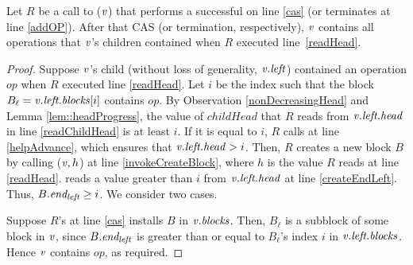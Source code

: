 \begin{lemma}\label{successfulRefresh}
Let $R$ be a call to ($\mbox{\textnormal{\textit{v}}}$) that performs a successful  on line \ref{cas} (or terminates at line \ref{addOP}).
After that CAS (or termination, respectively), $\mbox{\textnormal{\textit{v}}}$ contains all operations that $\mbox{\textnormal{\textit{v}}}$'s children contained 
when $R$ executed line~\ref{readHead}.
\end{lemma}
\begin{proof}
Suppose $\mbox{\textnormal{\textit{v}}}$'s child (without loss of generality, $\mbox{\textnormal{\textit{v}}}.\mbox{\textit{left}}$) contained an operation $op$ 
when $R$ executed line \ref{readHead}.
Let $i$ be the index such that the block $B_\ell=\mbox{\textnormal{\textit{v}}}.\mbox{\textit{left.blocks}}[i]$ contains $op$.
By Observation \ref{nonDecreasingHead} and Lemma \ref{lem::headProgress}, the value of $childHead$ that $R$ reads from
$\mbox{\textnormal{\textit{v}}}.\mbox{\textit{left.head}}$ in line \ref{readChildHead} is at least $i$.
If it is equal to $i$, $R$ calls  at line \ref{helpAdvance}, which ensures that 
$\mbox{\textnormal{\textit{v}}}.\mbox{\textit{left.head}} > i$.
Then, $R$ creates a new block $B$ by calling ($\mbox{\textnormal{\textit{v}}},h$) at line \ref{invokeCreateBlock}, where $h$ is the value $R$ reads at line \ref{readHead}.
 reads a value greater than $i$ from $\mbox{\textnormal{\textit{v}}}.\mbox{\textit{left.head}}$ at line \ref{createEndLeft}.
Thus, $B.\mbox{\textit{end\textsubscript{left}}} \geq i$.  We consider two cases.

Suppose $R$'s  at line \ref{cas} 
installs $B$ in $\mbox{\textnormal{\textit{v}}}.\mbox{\textit{blocks}}$.
Then, $B_\ell$ is a subblock of some block in $\mbox{\textnormal{\textit{v}}}$, since  $B.\mbox{\textit{end\textsubscript{left}}}$ is greater than or equal to $B_\ell$'s index
$i$ in $\mbox{\textnormal{\textit{v}}}.\mbox{\textit{left.blocks}}$.
Hence $\mbox{\textnormal{\textit{v}}}$ contains $op$, as required.


\end{proof}
